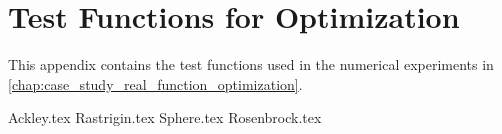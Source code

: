 \chapter{Test Functions for Optimization}
\label{chap:test_functions}
  This appendix contains the test functions used in the numerical experiments in 
  \vref{chap:case_study_real_function_optimization}.

  {Ackley.tex}
  {Rastrigin.tex}
  {Sphere.tex}
  {Rosenbrock.tex}